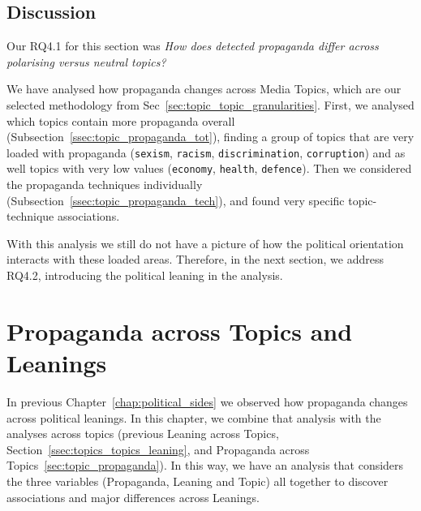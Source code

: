 



\subsection{\statusgreen Discussion}

Our RQ4.1 for this section was \emph{How does detected propaganda differ across polarising versus neutral topics?}

We have analysed how propaganda changes across Media Topics, which are our selected methodology from Sec~\ref{sec:topic_topic_granularities}.
First, we analysed which topics contain more propaganda overall (Subsection~\ref{ssec:topic_propaganda_tot}), finding a group of topics that are very loaded with propaganda (\texttt{sexism}, \texttt{racism}, \texttt{discrimination}, \texttt{corruption}) and as well topics with very low values (\texttt{economy}, \texttt{health}, \texttt{defence}).
Then we considered the propaganda techniques individually (Subsection~\ref{ssec:topic_propaganda_tech}), and found very specific topic-technique associations.

With this analysis we still do not have a picture of how the political orientation interacts with these loaded areas. Therefore, in the next section, we address RQ4.2, introducing the political leaning in the analysis.



\section{\statusgreen Propaganda across Topics and Leanings}
\label{sec:topic_propaganda_leaning}

In previous Chapter~\ref{chap:political_sides} we observed how propaganda changes across political leanings.
In this chapter, we combine that analysis with the analyses across topics (previous Leaning across Topics, Section~\ref{ssec:topics_topics_leaning}, and Propaganda across Topics~\ref{sec:topic_propaganda}).
In this way, we have an analysis that considers the three variables (Propaganda, Leaning and Topic) all together to discover associations and major differences across Leanings.

